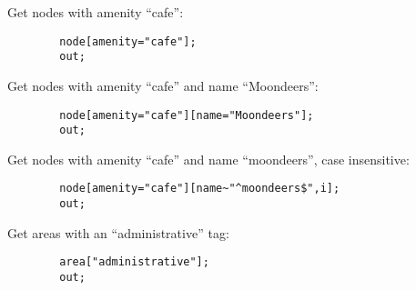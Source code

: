 \documentclass[main.tex]{subfiles}
\begin{document}
\pagebreak %
\begin{mexample}
    Get nodes with amenity ``cafe'':
    \begin{lstwrap}\begin{lstlisting}
        node[amenity="cafe"];
        out;
    \end{lstlisting}\end{lstwrap}

    Get nodes with amenity ``cafe'' and name ``Moondeers'':
    \begin{lstwrap}\begin{lstlisting}
        node[amenity="cafe"][name="Moondeers"];
        out;
    \end{lstlisting}\end{lstwrap}

    Get nodes with amenity ``cafe'' and name ``moondeers'', case insensitive:
    \begin{lstwrap}\begin{lstlisting}
        node[amenity="cafe"][name~"^moondeers$",i];
        out;
    \end{lstlisting}\end{lstwrap}

    Get areas with an ``administrative'' tag:
    \begin{lstwrap}\begin{lstlisting}
        area["administrative"];
        out;
    \end{lstlisting}\end{lstwrap}
\end{mexample}
\end{document}
